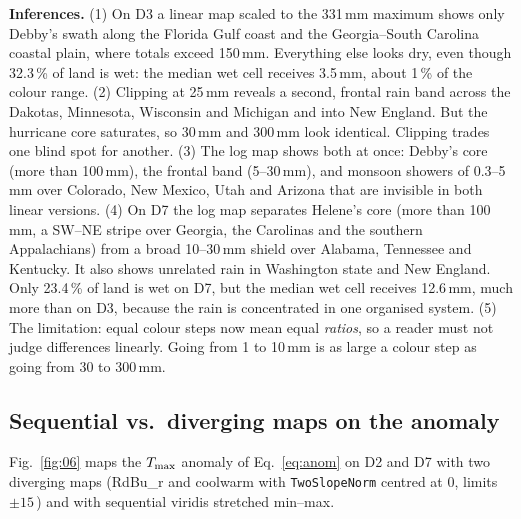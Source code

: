 \textbf{Inferences.}
(1) On D3 a linear map scaled to the 331\,mm maximum shows only Debby's swath along the Florida Gulf coast and the
Georgia--South Carolina coastal plain, where totals exceed 150\,mm. Everything else looks dry, even though 32.3\,\% of land
is wet: the median wet cell receives 3.5\,mm, about 1\,\% of the colour range.
(2) Clipping at 25\,mm reveals a second, frontal rain band across the Dakotas, Minnesota, Wisconsin and Michigan and into
New England. But the hurricane core saturates, so 30\,mm and 300\,mm look identical. Clipping trades one blind spot for
another.
(3) The log map shows both at once: Debby's core (more than 100\,mm), the frontal band (5--30\,mm), and monsoon
showers of 0.3--5\,mm over Colorado, New Mexico, Utah and Arizona that are invisible in both linear versions.
(4) On D7 the log map separates Helene's core (more than 100\,mm, a SW--NE stripe over Georgia, the Carolinas and the
southern Appalachians) from a broad 10--30\,mm shield over Alabama, Tennessee and Kentucky. It also shows unrelated rain in
Washington state and New England. Only 23.4\,\% of land is wet on D7, but the median wet cell receives 12.6\,mm, much more
than on D3, because the rain is concentrated in one organised system.
(5) The limitation: equal colour steps now mean equal \emph{ratios}, so a reader must not judge differences linearly.
Going from 1 to 10\,mm is as large a colour step as going from 30 to 300\,mm.

\subsection{Sequential vs.\ diverging maps on the anomaly}
Fig.~\ref{fig:06} maps the $T_{\max}$ anomaly of Eq.~\eqref{eq:anom} on D2 and D7 with two diverging maps (RdBu\_r and coolwarm
with \texttt{TwoSlopeNorm} centred at 0, limits $\pm15$\,\degC) and with sequential viridis stretched min--max.


